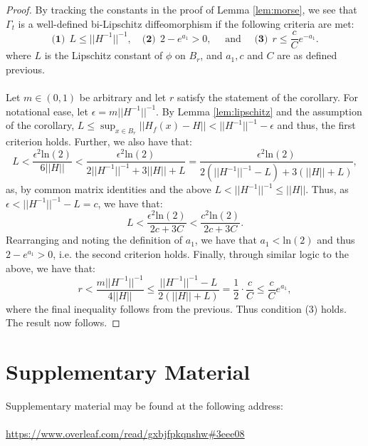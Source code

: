 \documentclass[11pt]{article}
\newcommand{\1}{\mathbf{1}}
\theoremstyle{definition}
\theoremstyle{remark}
\begin{document}
\begin{proof}
    By tracking the constants in the proof of Lemma \ref{lem:morse}, we see that $\Gamma_t$ is a well-defined bi-Lipschitz diffeomorphism if the following criteria are met:
    \begin{equation}\nonumber
       \textbf{(1)}~~ L \leq ||H^{-1}||^{-1}, \quad \textbf{(2)}~~ 2-e^{a_1} > 0, \quad \text{ and } \quad \textbf{(3)}~~ r \leq \frac{c}{C}e^{-a_1}.
    \end{equation}
    where $L$ is the Lipschitz constant of $\phi$ on $B_r$, and $a_1, c$ and $C$ are as defined previous.\\
    \\
    Let $m\in(0,1)$ be arbitrary and let $r$ satisfy the statement of the corollary. For notational ease, let $\epsilon=m||H^{-1}||^{-1}$. By Lemma \ref{lem:lipschitz} and the assumption of the corollary, $L\leq\sup_{x\in B_r}||H_f(x)-H||<||H^{-1}||^{-1}-\epsilon$ and thus, the first criterion holds. Further, we also have that:
    \begin{equation}\nonumber
        L < \frac{\epsilon^2\text{ln}(2)}{6||H||} < \frac{\epsilon^2\text{ln}(2)}{2||H^{-1}||^{-1} + 3||H|| + L} = \frac{\epsilon^2\text{ln}(2)}{2(||H^{-1}||^{-1}-L) + 3(||H|| + L)},
    \end{equation}
    as, by common matrix identities and the above $L<||H^{-1}||^{-1}\leq||H||$. Thus, as $\epsilon < ||H^{-1}||^{-1}-L=c$, we have that:
    \begin{equation}\nonumber
        L < \frac{\epsilon^2\text{ln}(2)}{2c + 3C} < \frac{c^2\text{ln}(2)}{2c + 3C}.
    \end{equation}
    Rearranging and noting the definition of $a_1$, we have that $a_1<\text{ln}(2)$ and thus $2-e^{a_1}>0$, i.e. the second criterion holds.  Finally, through similar logic to the above, we have that:
    \begin{equation}\nonumber
        r < \frac{m||H^{-1}||^{-1}}{4||H||} \leq \frac{||H^{-1}||^{-1}-L}{2(||H||+L)} = \frac{1}{2}\cdot\frac{c}{C} \leq \frac{c}{C} e^{a_1},
    \end{equation}
    where the final inequality follows from the previous. Thus condition (3) holds. The result now follows.
\end{proof}
\vspace*{2cm}
\section*{Supplementary Material}

Supplementary material may be found at the following address:\\
\\
\textcolor{blue}{\underline{\href{https://www.overleaf.com/read/gxbjfpkqnshw\#3eee08}{https://www.overleaf.com/read/gxbjfpkqnshw\#3eee08}}}



\end{document}
